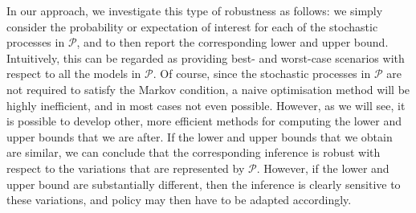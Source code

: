 \documentclass[10pt,a4paper]{paper}
\theoremstyle{definition}
\begin{document}
In our approach, we investigate this type of robustness as follows: we simply consider the probability or expectation of interest for each of the stochastic processes in $\mathcal{P}$, and to then report the corresponding lower and upper bound. Intuitively, this can be regarded as providing best- and worst-case scenarios with respect to all the models in $\mathcal{P}$.
Of course, since the stochastic processes in $\mathcal{P}$ are not required to satisfy the Markov condition, a naive optimisation method will be highly inefficient, and in most cases not even possible. However, as we will see, it is possible to develop other, more efficient methods for computing the lower and upper bounds that we are after. If the lower and upper bounds that we obtain are similar, we can conclude that the corresponding inference is robust with respect to the variations that are represented by $\mathcal{P}$. However, if the lower and upper bound are substantially different, then the inference is clearly sensitive to these variations, and policy may then have to be adapted accordingly. 



\end{document}
